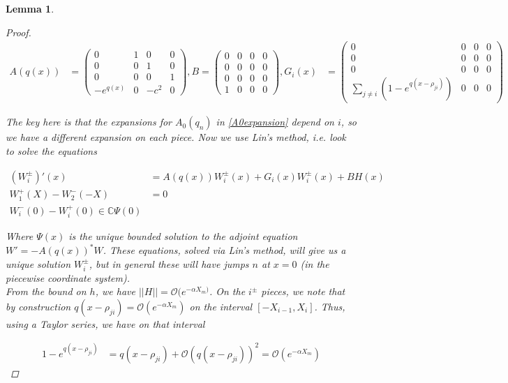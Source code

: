 \documentclass[12pt]{article}
\def\C{{\mathbb C}}
\newtheorem{lemma}{Lemma}
\begin{document}
\begin{lemma}
\begin{proof}
\begin{align*}
A(q(x)) &= \begin{pmatrix}
0 & 1 & 0 & 0 \\
0 & 0 & 1 & 0 \\
0 & 0 & 0 & 1 \\
-e^{q(x)} & 0 & -c^2 & 0 
\end{pmatrix},
B = \begin{pmatrix}
0 & 0 & 0 & 0 \\
0 & 0 & 0 & 0 \\
0 & 0 & 0 & 0 \\
1 & 0 & 0 & 0 
\end{pmatrix},
G_i(x) &= \begin{pmatrix}
0 & 0 & 0 & 0 \\
0 & 0 & 0 & 0 \\
0 & 0 & 0 & 0 \\
\sum_{j \neq i} (1 - e^{q(x - \rho_{ji})}) & 0 & 0 & 0 
\end{pmatrix}
\end{align*}

The key here is that the expansions for $A_0(q_n)$ in \eqref{A0expansion} depend on $i$, so we have a different expansion on each piece. Now we use Lin's method, i.e. look to solve the equations

\begin{align}
(W_i^\pm)'(x) &= A(q(x)) W_i^\pm(x) + G_i(x) W_i^\pm(x)+ B H(x) \nonumber \\
W_1^+(X) - W_2^-(-X) &= 0 \label{Wsystem} \\
W_i^-(0) - W_i^+(0) \in \C \Psi(0) \nonumber 
\end{align}

Where $\Psi(x)$ is the unique bounded solution to the adjoint equation $W' = -A(q(x))^* W$. These equations, solved via Lin's method, will give us a unique solution $W_i^\pm$, but in general these will have jumps $n$ at $x = 0$ (in the piecewise coordinate system).\\

From the bound on $h$, we have $||H|| = \mathcal{O}(e^{-\alpha X_m)}$. On the $i^\pm$ pieces, we note that by construction $q(x - \rho_{ji}) = \mathcal{O}(e^{-\alpha X_m})$ on the interval $[-X_{i-1}, X_i]$. Thus, using a Taylor series, we have on that interval

\begin{align*}
1 - e^{q(x - \rho_{ji})} &= q(x - \rho_{ji}) + \mathcal{O}(q(x - \rho_{ji}))^2 = \mathcal{O}(e^{-\alpha X_m})
\end{align*}


\end{proof}
\end{lemma}
\end{document}
